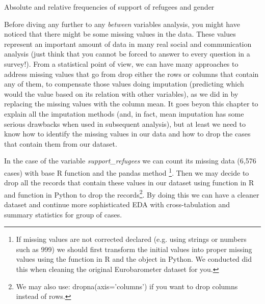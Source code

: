 \begin{ccsexample}
\caption{Absolute and relative frequencies of support of refugees and gender}
\end{ccsexample}


Before diving any further to any \textit{between} variables analysis, you might have noticed that there might be some missing values in the data. These values represent an important amount of data in many real social and communication analysis (just think that you cannot be forced to answer to every question in a survey!). From a statistical point of view, we can have many approaches to address missing values that go from drop either the rows or columns that contain any of them, to compensate those values doing imputation (predicting which would the value based on its relation with other variables), as we did in  by replacing the missing values with the column mean. It goes beyon this chapter to explain all the imputation methods (and, in fact, mean imputation has some serious drawbacks when used in subsequent analysis), but at least we need to know how to identify the missing values in our data and how to drop the cases that contain them from our dataset.

In the case of the variable \textit{support\_refugees} we can count its missing data (6,576 cases) with base R function  and the pandas method \footnote{If missing values are not corrected declared (e.g. using strings or numbers such as 999) we should first transform the initial values into proper missing values using the  function  in R and the  object  in Python. We conducted did this when cleaning the original Eurobarometer dataset for you.}.  Then we may decide to drop all the records that contain these values in our dataset using  function  in R and  function  in Python to drop the records\footnote{We may also use: dropna(axis='columns') if you want to drop columns instead of rows.}. By doing this we can have a cleaner dataset and continue more sophisticated EDA with cross-tabulation and summary statistics for group of cases.	


